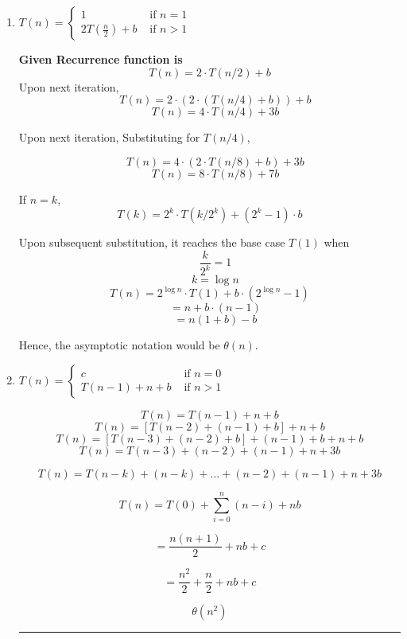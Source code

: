 \documentclass[11pt]{article}
\newcommand{\finishproblem}{
    \vspace{10pt}
    \hrule
    \vspace{10pt}
}
\theoremstyle{definition}
\newcommand{\solution}{\medskip\noindent{\color{DarkBlue}\textbf{Solution:}}}
\begin{document}
\begin{enumerate}[label=(\alph*)]
\item $T(n)= \begin{cases}1 & \text { if } n=1 \\
2 T\left(\frac{n}{2}\right)+b & \text { if } n>1\end{cases}$ \\
\solution

\textbf{Given Recurrence function is}
\[
T(n) = 2 \cdot T(n/2) + b
\]
Upon next iteration,
\[\quad T(n) = 2 \cdot \left( 2 \cdot \left( T(n/4) + b \right) \right) + b\]
\[\quad T(n) = 4 \cdot T(n/4) + 3b\]

Upon next iteration, Substituting for \( T(n/4) \),  

\[
\quad T(n) = 4 \cdot \left( 2 \cdot T(n/8) + b \right) + 3b
\]
\[
\quad T(n) = 8 \cdot T(n/8) + 7b
\]

If \( n = k \),  
\[
T(k) = 2^k \cdot T(k/2^k) + (2^k - 1) \cdot b
\]

Upon subsequent substitution, it reaches the base case \( T(1) \) when  
\[ \quad \frac{k}{2^k} = 1 \]
\[ \quad k = \log n \]
\[ T(n) = 2^{\log n} \cdot T(1) + b \cdot \left( 2^{\log n} - 1 \right) \]
\[\quad = n + b \cdot (n - 1)\]
\[ \quad = n(1 + b) - b \]

Hence, the asymptotic notation would be \( \theta(n) \).

\item $T(n)= \begin{cases}c & \text { if } n=0 \\
T(n-1)+n+b & \text { if } n>1\end{cases}$ \\
\solution

\[
T(n) = T(n-1) + n + b
\]
\[
T(n) = \left[ T(n-2) + (n-1) + b \right] + n + b
\]
\[
T(n) = \left[ T(n-3) + (n-2) + b \right] + (n-1) + b + n + b
\]
\[
T(n) = T(n-3) + (n-2) + (n-1) + n + 3b
\]

\[
T(n) = T(n-k) + (n-k) + \dots + (n-2) + (n-1) + n + 3b
\]

\[
T(n) = T(0) + \sum_{i=0}^{n} (n-i) + nb
\]

\[
= \frac{n(n+1)}{2} + nb + c
\]

\[
= \frac{n^2}{2} + \frac{n}{2} + nb + c
\]

 \[ \theta(n^2) \]

\finishproblem
\end{enumerate}
\end{document}
